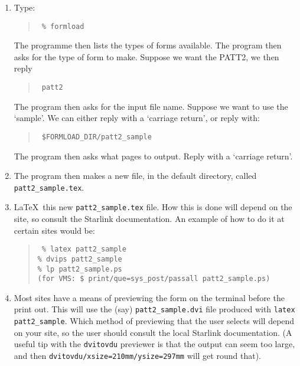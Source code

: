 \begin{enumerate}

\item Type:

\begin{quote}\tt
\% formload
\end{quote}

The programme then lists the types of forms available.  The program
then asks for the type of form to make. Suppose we want the  PATT2, we
then reply

\begin{quote}\tt
patt2
\end{quote}

The program then asks for the input file name. Suppose we want to use
the `sample'. We can either reply with a `carriage return', or reply
with:

\begin{quote}\tt
\$FORMLOAD\_DIR/patt2\_sample
\end{quote}

The program then asks what pages to output. Reply with a `carriage return'.

\item The program then makes a new file, in the default directory, called
{\tt patt2\_sample.tex}.

\item \LaTeX\ this new {\tt patt2\_sample.tex} file. How this is done
will depend on the site, so consult the Starlink documentation. An
example of how to do it at certain sites would be:

\begin{quote}\tt
\% latex patt2\_sample \\
\% dvips patt2\_sample \\
\% lp patt2\_sample.ps \\
(for VMS: \$ print/que=sys\_post/passall patt2\_sample.ps)
\end{quote}

\item Most sites have a means of previewing the form on the terminal
before the print out. This will use the (say) {\tt patt2\_sample.dvi}
file produced with {\tt latex patt2\_sample}. Which method of previewing
that the user selects will depend on your site, so the user should
consult the local Starlink documentation. (A useful tip with the
{\tt dvitovdu} previewer is that the output can seem too large, and then
{\tt dvitovdu/xsize=210mm/ysize=297mm} will get round that).

\end{enumerate}

